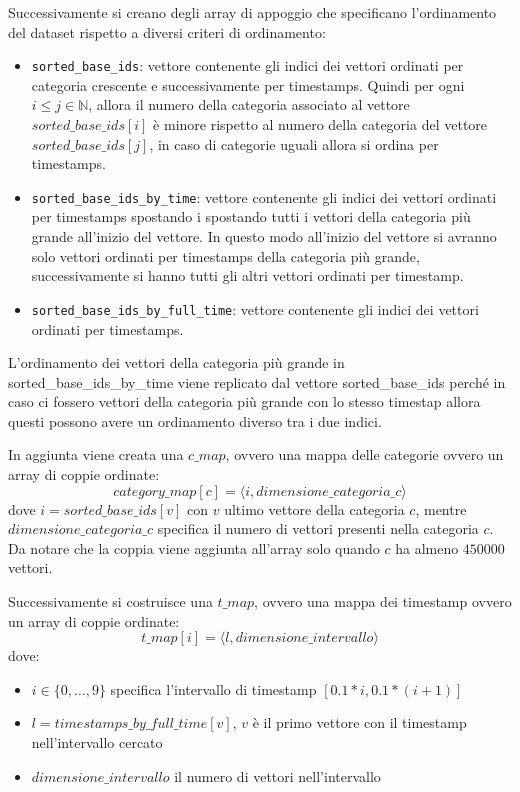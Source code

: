 Successivamente si creano degli array di appoggio che specificano l'ordinamento 
del dataset rispetto a diversi criteri di ordinamento:
\begin{itemize}
    \item \texttt{sorted\_base\_ids}: vettore contenente gli indici dei vettori ordinati 
    per categoria crescente e successivamente per timestamps. Quindi per ogni $i\le j\in \mathbb{N}$,
    allora il numero della categoria associato al vettore $sorted\_base\_ids[i]$
    è minore rispetto al numero della categoria del vettore $sorted\_base\_ids[j]$,
    in caso di categorie uguali allora si ordina per timestamps.
    \item \texttt{sorted\_base\_ids\_by\_time}: vettore contenente gli indici dei vettori ordinati 
    per timestamps spostando i spostando tutti i vettori della categoria più grande all'inizio 
    del vettore. In questo modo all'inizio del vettore si avranno solo vettori 
    ordinati per timestamps della categoria più grande, successivamente si hanno 
    tutti gli altri vettori ordinati per timestamp. 
    \item \texttt{sorted\_base\_ids\_by\_full\_time}: vettore contenente gli indici dei vettori ordinati 
    per timestamps.
\end{itemize}

\begin{nota}
    L'ordinamento dei vettori della categoria più grande in sorted\_base\_ids\_by\_time 
    viene replicato dal vettore sorted\_base\_ids perché in caso ci fossero vettori 
    della categoria più grande con lo stesso timestap allora questi possono avere 
    un ordinamento diverso tra i due indici.
\end{nota}

In aggiunta viene creata una $c\_map$, ovvero una mappa delle categorie ovvero 
un array di coppie ordinate:
\begin{equation}
    category\_map[c] = \langle i, dimensione\_categoria\_c\rangle
\end{equation} 
dove $i = sorted\_base\_ids[v]$ con $v$ ultimo vettore della categoria $c$, 
mentre $dimensione\_categoria\_c$ specifica il numero di vettori presenti nella 
categoria $c$. Da notare che la coppia viene aggiunta all'array solo quando $c$ 
ha almeno $450000$ vettori.

Successivamente si costruisce una $t\_map$, ovvero una mappa dei timestamp ovvero 
un array di coppie ordinate:
\begin{equation}
    t\_map[i] = \langle l, dimensione\_intervallo\rangle
\end{equation} 
dove:
\begin{itemize}
    \item $i\in \{0,\dots,9\}$ specifica l'intervallo di timestamp $[0.1*i, 0.1*(i+1)]$
    \item $l= timestamps\_by\_full\_time[v]$, $v$ è il primo vettore con il timestamp nell'intervallo cercato
    \item $dimensione\_intervallo$ il numero di vettori nell'intervallo
\end{itemize}

